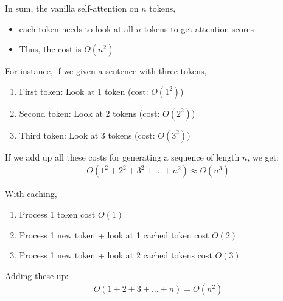 In sum, the vanilla self-attention on $n$ tokens,
\begin{itemize}
	\item each token needs to look at all $n$ tokens to get attention scores
    \item Thus, the cost is $O(n^2)$ 
\end{itemize}

For instance, if we given a sentence with three tokens,
\begin{enumerate}
	\item First token: Look at 1 token (cost: $O(1^2)$)
	\item Second token: Look at 2 tokens (cost: $O(2^2)$)
	\item Third token: Look at 3 tokens (cost: $O(3^2)$)
\end{enumerate}

If we add up all these costs for generating a sequence of length $n$, we get:
\begin{align*}
	O(1^2+2^2+3^2+\dots+n^2)\approx O(n^3)
\end{align*}

With caching,
\begin{enumerate}
	\item Process 1 token cost $O(1)$
	\item Process 1 new token + look at 1 cached token cost $O(2)$
	\item Process 1 new token + look at 2 cached tokens cost $O(3)$ 
\end{enumerate}

Adding these up:
\begin{align*}
	O(1+2+3+\dots+n)=O(n^2)
\end{align*}


